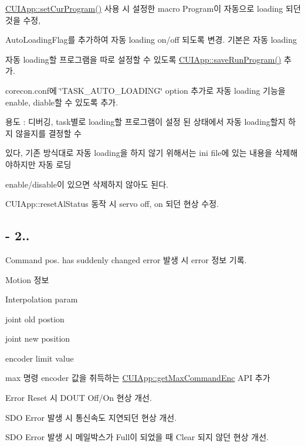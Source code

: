 \begin{DoxyEnumerate}
\item \hyperlink{classCUIApp_a248c0a953c6af72b5419d7b001b5dd39}{C\-U\-I\-App\-::set\-Cur\-Program()} 사용 시 설정한 macro Program이 자동으로 loading 되던 것을 수정,
\begin{DoxyItemize}
\item Auto\-Loading\-Flag를 추가하여 자동 loading on/off 되도록 변경. 기본은 자동 loading
\end{DoxyItemize}
\item 자동 loading할 프로그램을 따로 설정할 수 있도록 \hyperlink{classCUIApp_a400be7d1d827f7a7db158f84a50b65ff}{C\-U\-I\-App\-::save\-Run\-Program()} 추가.
\item corecon.\-conf에 \char`\"{}\-T\-A\-S\-K\-\_\-\-A\-U\-T\-O\-\_\-\-L\-O\-A\-D\-I\-N\-G\char`\"{} option 추가로 자동 loading 기능을 enable, diable할 수 있도록 추가.
\begin{DoxyItemize}
\item 용도 \-: 디버깅, task별로 loading할 프로그램이 설정 된 상태에서 자동 loading할지 하지 않을지를 결정할 수 \par
 있다, 기존 방식대로 자동 loading을 하지 않기 위해서는 ini file에 있는 내용을 삭제해야하지만 자동 로딩\par
 enable/disable이 있으면 삭제하지 않아도 된다.
\end{DoxyItemize}
\item C\-U\-I\-App\-::reset\-Al\-Status 동작 시 servo off, on 되던 현상 수정.
\end{DoxyEnumerate}

\subsection*{-\/ 2..}


\begin{DoxyEnumerate}
\item Command pos. has suddenly changed error 발생 시 error 정보 기록.
\begin{DoxyItemize}
\item Motion 정보
\item Interpolation param
\item joint old postion
\item joint new position
\item encoder limit value
\end{DoxyItemize}
\item max 명령 encoder 값을 취득하는 \hyperlink{classCUIApp_a2d46b9b2b22bb7246d3792cf4bad2f44}{C\-U\-I\-App\-::get\-Max\-Command\-Enc} A\-P\-I 추가
\item Error Reset 시 D\-O\-U\-T Off/\-On 현상 개선.
\item S\-D\-O Error 발생 시 통신속도 지연되던 현상 개선.
\item S\-D\-O Error 발생 시 메일박스가 Full이 되었을 때 Clear 되지 않던 현상 개선.
\end{DoxyEnumerate}

